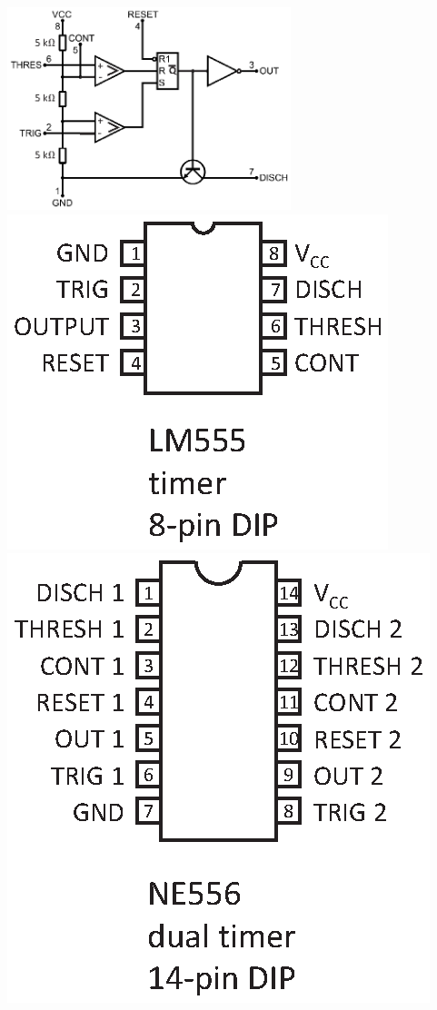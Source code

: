 \begin{center}
\vspace{-0.05in}
\includegraphics[width=3.25in]{timers/555_block_diagram.eps}
\hspace{-0.2in}\includegraphics[scale=0.75]{appendices/pinouts/lm555_simple.eps}
\hspace{-0.2in}\includegraphics[scale=0.75]{appendices/pinouts/ne556_abrev.eps}
\vspace{-0.05in}
\end{center}

